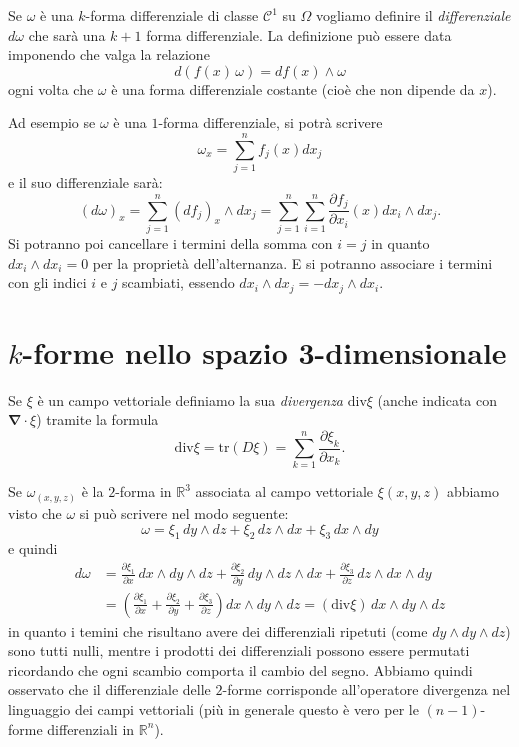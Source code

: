 \documentclass[italian,a4paper]{scrartcl}
\newcommand{\RR}{{\mathbb R}}
\renewcommand{\div}{\mathrm{div}}
\newcommand{\vecnabla}{\mathbf{\nabla}}
\newcommand{\tr}{\mathrm{tr}}
\begin{document}
Se $\omega$ è una $k$-forma differenziale di classe $\mathcal C^1$ su
$\Omega$ vogliamo definire il \emph{differenziale} $d\omega$ che sarà
una $k+1$ forma differenziale. La definizione può essere data
imponendo che valga la relazione
\[
  d(f(x)\, \omega) = df(x) \wedge \omega
\]
ogni volta che $\omega$ è una forma differenziale costante (cioè che
non dipende da $x$).


Ad esempio se $\omega$ è una $1$-forma differenziale, si potrà
scrivere
\[
  \omega_x = \sum_{j=1}^n f_j(x) dx_j
\]
e il suo differenziale sarà:
\[
  (d\omega)_x = \sum_{j=1}^n (df_j)_x \wedge dx_j
  =\sum_{j=1}^n \sum_{i=1}^n \frac{\partial f_j}{\partial x_i}(x) dx_i
  \wedge dx_j.
\]
Si potranno poi cancellare i termini della somma con $i=j$ in quanto
$dx_i\wedge dx_i=0$ per la proprietà dell'alternanza. E si potranno
associare i termini con gli indici $i$ e $j$ scambiati, essendo $dx_i
\wedge dx_j = - dx_j \wedge dx_i$.

\section{$k$-forme nello spazio 3-dimensionale}

Se $\xi$ è un campo vettoriale definiamo la sua \emph{divergenza}
$\div \xi$ (anche indicata con $\vecnabla \cdot \xi$) tramite la formula
\[
  \div \xi = \tr( D\xi) = \sum_{k=1}^n \frac{\partial \xi_k}{\partial x_k}.
\]

Se $\omega_{(x,y,z)}$ è la $2$-forma in $\RR^3$ associata al campo vettoriale
$\xi(x,y,z)$ abbiamo visto che $\omega$ si può scrivere nel modo seguente:
\[
   \omega = \xi_1\, dy \wedge dz + \xi_2\, dz\wedge dx +
   \xi_3\, dx\wedge dy
\]
e quindi
\begin{align*}
  d \omega &=
  \frac{\partial \xi_1}{\partial x}\, dx\wedge dy\wedge dz +
  \frac{\partial \xi_2}{\partial y}\, dy\wedge dz\wedge dx +
  \frac{\partial \xi_3}{\partial z}\, dz\wedge dx\wedge dy \\
  & =
  \left(\frac{\partial \xi_1}{\partial x} +
  \frac{\partial \xi_2}{\partial y} +
  \frac{\partial \xi_3}{\partial z}\right)
  dx\wedge dy\wedge dz
  = (\div \xi)\, dx\wedge dy\wedge dz
\end{align*}
in quanto i temini che risultano avere dei differenziali ripetuti
(come $dy \wedge dy \wedge dz$) sono tutti nulli, mentre i prodotti
dei differenziali possono essere permutati ricordando che ogni scambio
comporta il cambio del segno. Abbiamo quindi osservato che il
differenziale delle $2$-forme corrisponde all'operatore divergenza nel
linguaggio dei campi vettoriali (più in generale questo è vero per le
$(n-1)$-forme differenziali in $\RR^n$).
\end{document}
